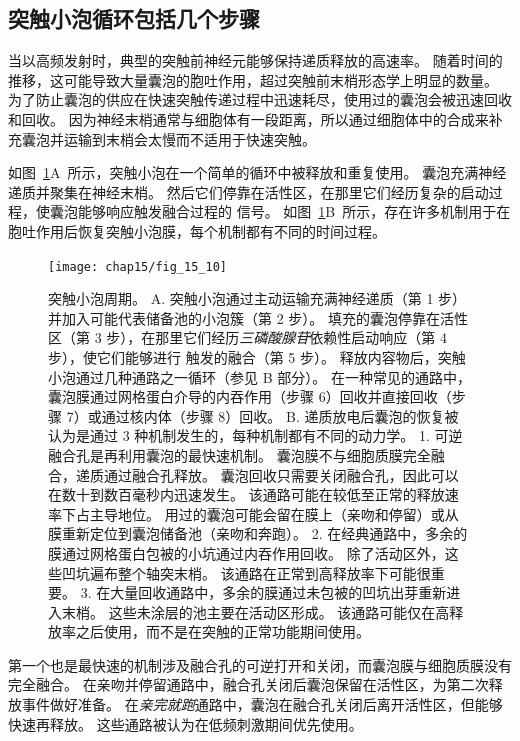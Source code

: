 \subsection{突触小泡循环包括几个步骤}

当以高频发射时，典型的突触前神经元能够保持递质释放的高速率。
随着时间的推移，这可能导致大量囊泡的胞吐作用，超过突触前末梢形态学上明显的数量。
为了防止囊泡的供应在快速突触传递过程中迅速耗尽，使用过的囊泡会被迅速回收和回收。
因为神经末梢通常与细胞体有一段距离，所以通过细胞体中的合成来补充囊泡并运输到末梢会太慢而不适用于快速突触。


如图~\ref{fig:15_10}A~所示，突触小泡在一个简单的循环中被释放和重复使用。
囊泡充满神经递质并聚集在神经末梢。
然后它们停靠在活性区，在那里它们经历复杂的启动过程，使囊泡能够响应触发融合过程的  信号。
如图~\ref{fig:15_10}B~所示，存在许多机制用于在胞吐作用后恢复突触小泡膜，每个机制都有不同的时间过程。


\begin{figure}[htbp]
	\centering
	\texttt{[image: chap15/fig\_15\_10]}
	\caption{突触小泡周期。
		A. 突触小泡通过主动运输充满神经递质（第 1 步）并加入可能代表储备池的小泡簇（第 2 步）。
		填充的囊泡停靠在活性区（第 3 步），在那里它们经历\textit{三磷酸腺苷}依赖性启动响应（第 4 步），使它们能够进行  触发的融合（第 5 步）。
		释放内容物后，突触小泡通过几种通路之一循环（参见 B 部分）。
		在一种常见的通路中，囊泡膜通过网格蛋白介导的内吞作用（步骤 6）回收并直接回收（步骤 7）或通过核内体（步骤 8）回收。
		B. 递质放电后囊泡的恢复被认为是通过 3 种机制发生的，每种机制都有不同的动力学。
		1. 可逆融合孔是再利用囊泡的最快速机制。
		囊泡膜不与细胞质膜完全融合，递质通过融合孔释放。
		囊泡回收只需要关闭融合孔，因此可以在数十到数百毫秒内迅速发生。
		该通路可能在较低至正常的释放速率下占主导地位。
		用过的囊泡可能会留在膜上（亲吻和停留）或从膜重新定位到囊泡储备池（亲吻和奔跑）。
		2. 在经典通路中，多余的膜通过网格蛋白包被的小坑通过内吞作用回收。
		除了活动区外，这些凹坑遍布整个轴突末梢。
		该通路在正常到高释放率下可能很重要。
		3. 在大量回收通路中，多余的膜通过未包被的凹坑出芽重新进入末梢。
		这些未涂层的池主要在活动区形成。
		该通路可能仅在高释放率之后使用，而不是在突触的正常功能期间使用\cite{schweizer1995vesicle}。}
	\label{fig:15_10}
\end{figure}


第一个也是最快速的机制涉及融合孔的可逆打开和关闭，而囊泡膜与细胞质膜没有完全融合。
在亲吻并停留通路中，融合孔关闭后囊泡保留在活性区，为第二次释放事件做好准备。
在\textit{亲完就跑}通路中，囊泡在融合孔关闭后离开活性区，但能够快速再释放。
这些通路被认为在低频刺激期间优先使用。


